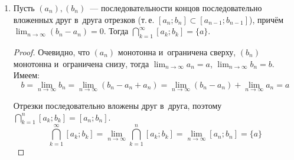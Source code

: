 \begin{enumerate}
	\item \begin{lemma}
	Пусть $(a_n), (b_n)$~--- последовательности концов последовательно вложенных друг в~друга отрезков (т.\,е. $[a_n; b_n] \subset [a_{n-1}; b_{n-1}]$), причём $\displaystyle \lim_{n \to \infty} (b_n - a_n) = 0$.
	Тогда $\displaystyle \bigcap_{k=1}^\infty [a_k; b_k] = \{ a \}$.
	\end{lemma}
	\begin{proof}
	Очевидно, что $(a_n)$ монотонна и~ограничена сверху, $(b_n)$ монотонна и~ограничена снизу, тогда $\displaystyle \lim_{n \to \infty} a_n = a$, $\displaystyle \lim_{n \to \infty} b_n = b$.
	Имеем:
	\begin{equation*}
	b = \lim_{n \to \infty} b_n = \lim_{n \to \infty} (b_n - a_n + a_n) = \lim_{n \to \infty} (b_n - a_n) + \lim_{n \to \infty} a_n = a
	\end{equation*}
	
	Отрезки последовательно вложены друг в~друга, поэтому $\displaystyle \bigcap_{k=1}^n [a_k; b_k] = [a_n; b_n]$.
	\begin{equation*}
	\bigcap_{k=1}^\infty [a_k; b_k] = \lim_{n \to \infty} \bigcap_{k=1}^n [a_k; b_k] = \lim_{n \to \infty} [a_n; b_n] = \{ a \}
	\end{equation*}
	\end{proof}
\end{enumerate}